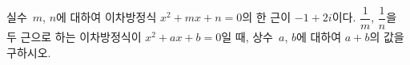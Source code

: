 실수~$m$, $n$에 대하여 이차방정식 $x^2+mx+n=0$의 한 근이 $-1+2i$이다. $\dfrac{1}{m}$, $\dfrac{1}{n}$을 두 근으로 하는 이차방정식이 $x^2+ax+b=0$일 때, 상수~$a$, $b$에 대하여 $a+b$의 값을 구하시오. 
